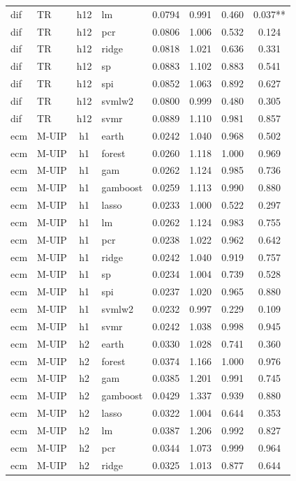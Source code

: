 \begin{ThreePartTable}
\begin{longtable}[t]{llclcccc}
dif & TR & h12 & lm & 0.0794 & 0.991 & 0.460 & 0.037**\\
dif & TR & h12 & pcr & 0.0806 & 1.006 & 0.532 & 0.124\\
dif & TR & h12 & ridge & 0.0818 & 1.021 & 0.636 & 0.331\\
dif & TR & h12 & sp & 0.0883 & 1.102 & 0.883 & 0.541\\
dif & TR & h12 & spi & 0.0852 & 1.063 & 0.892 & 0.627\\
dif & TR & h12 & svmlw2 & 0.0800 & 0.999 & 0.480 & 0.305\\
dif & TR & h12 & svmr & 0.0889 & 1.110 & 0.981 & 0.857\\
\addlinespace
ecm & M-UIP & h1 & earth & 0.0242 & 1.040 & 0.968 & 0.502\\
ecm & M-UIP & h1 & forest & 0.0260 & 1.118 & 1.000 & 0.969\\
ecm & M-UIP & h1 & gam & 0.0262 & 1.124 & 0.985 & 0.736\\
ecm & M-UIP & h1 & gamboost & 0.0259 & 1.113 & 0.990 & 0.880\\
ecm & M-UIP & h1 & lasso & 0.0233 & 1.000 & 0.522 & 0.297\\
ecm & M-UIP & h1 & lm & 0.0262 & 1.124 & 0.983 & 0.755\\
ecm & M-UIP & h1 & pcr & 0.0238 & 1.022 & 0.962 & 0.642\\
ecm & M-UIP & h1 & ridge & 0.0242 & 1.040 & 0.919 & 0.757\\
ecm & M-UIP & h1 & sp & 0.0234 & 1.004 & 0.739 & 0.528\\
ecm & M-UIP & h1 & spi & 0.0237 & 1.020 & 0.965 & 0.880\\
ecm & M-UIP & h1 & svmlw2 & 0.0232 & 0.997 & 0.229 & 0.109\\
ecm & M-UIP & h1 & svmr & 0.0242 & 1.038 & 0.998 & 0.945\\
\addlinespace
ecm & M-UIP & h2 & earth & 0.0330 & 1.028 & 0.741 & 0.360\\
ecm & M-UIP & h2 & forest & 0.0374 & 1.166 & 1.000 & 0.976\\
ecm & M-UIP & h2 & gam & 0.0385 & 1.201 & 0.991 & 0.745\\
ecm & M-UIP & h2 & gamboost & 0.0429 & 1.337 & 0.939 & 0.880\\
ecm & M-UIP & h2 & lasso & 0.0322 & 1.004 & 0.644 & 0.353\\
ecm & M-UIP & h2 & lm & 0.0387 & 1.206 & 0.992 & 0.827\\
ecm & M-UIP & h2 & pcr & 0.0344 & 1.073 & 0.999 & 0.964\\
ecm & M-UIP & h2 & ridge & 0.0325 & 1.013 & 0.877 & 0.644\\

\end{longtable}
\end{ThreePartTable}
